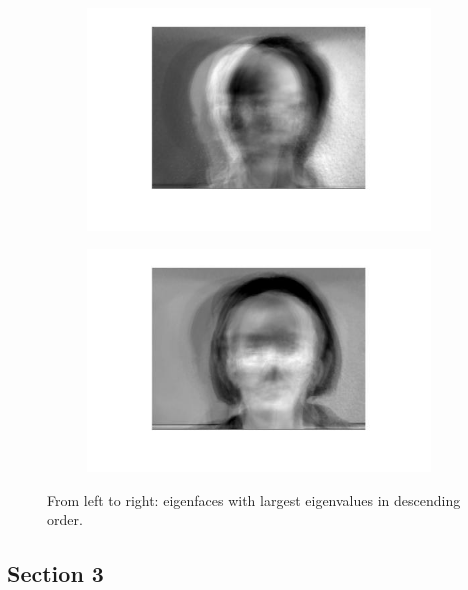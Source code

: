 \documentclass[a4paper]{iacas}
\begin{document}
\begin{figure}[!htbp]
\begin{subfigure}[b]{0.18\textwidth}
		\caption{}
		\label{fig:203}
	\end{subfigure}
	\begin{subfigure}[b]{0.18\textwidth}
		\includegraphics[width=\textwidth]{204.jpg}
		\caption{}
		\label{fig:204}
	\end{subfigure}
	\begin{subfigure}[b]{0.18\textwidth}
		\includegraphics[width=\textwidth]{205.jpg}
		\caption{}
		\label{fig:205}
	\end{subfigure}
	
	\caption{From left to right: eigenfaces with largest eigenvalues in descending order.}
	\label{fig:200}
\end{figure}

\subsection{Section 3}
\end{document}
